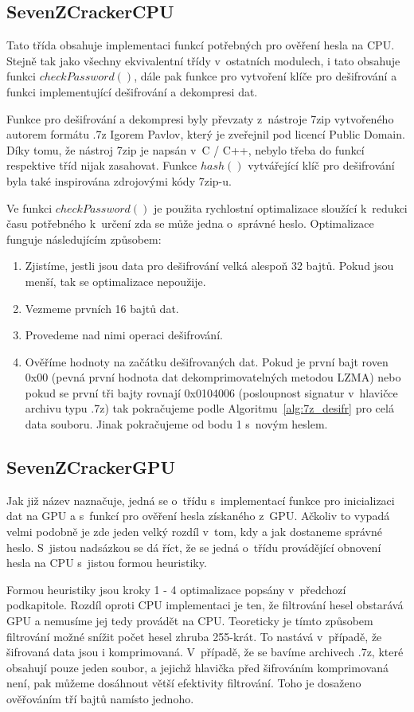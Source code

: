 \subsection{SevenZCrackerCPU}
\label{ssec:7zcrackercpu}
Tato třída obsahuje implementaci funkcí potřebných pro ověření hesla na CPU. Stejně tak jako
všechny ekvivalentní třídy v~ostatních modulech, i tato obsahuje funkci $checkPassword()$, dále pak
funkce pro vytvoření klíče pro dešifrování a funkci implementující dešifrování a dekompresi dat.

 Funkce pro dešifrování a dekompresi byly převzaty z~nástroje 7zip vytvořeného autorem formátu .7z
Igorem Pavlov, který je zveřejnil pod licencí Public Domain. Díky tomu, že nástroj 7zip je
napsán v~C / C++, nebylo třeba do funkcí respektive tříd nijak zasahovat. Funkce $hash()$
vytvářející klíč pro dešifrování byla také inspirována zdrojovými kódy 7zip-u. 

 Ve funkci $checkPassword()$ je použita rychlostní optimalizace sloužící k~redukci času
potřebného k~určení zda se může jedna o~správné heslo. Optimalizace funguje následujícím způsobem:
\begin{enumerate}
    \item Zjistíme, jestli jsou data pro dešifrování velká alespoň 32 bajtů. Pokud jsou menší, tak
	se optimalizace nepoužije.
    \item Vezmeme prvních 16 bajtů dat.
    \item Provedeme nad nimi operaci dešifrování.
    \item Ověříme hodnoty na začátku dešifrovaných dat. Pokud je první bajt roven 0x00
	(pevná první hodnota dat dekomprimovatelných metodou LZMA) nebo pokud se první tři bajty rovnají
	0x0104006 (posloupnost signatur v~hlavičce archivu typu .7z) tak pokračujeme podle
	Algoritmu~\ref{alg:7z_desifr} pro celá data souboru. Jinak pokračujeme od bodu 1 s~novým heslem.
\end{enumerate}
\subsection{SevenZCrackerGPU}
Jak již název naznačuje, jedná se o~třídu s~implementací funkce pro inicializaci dat na GPU a
s~funkcí pro ověření hesla získaného z~GPU. Ačkoliv to vypadá velmi podobně je zde jeden velký
rozdíl v~tom, kdy a jak dostaneme správné heslo. S~jistou nadsázkou se dá říct, že se jedná
o~třídu provádějící obnovení hesla na CPU s~jistou formou heuristiky. 

Formou heuristiky jsou kroky 1 - 4 optimalizace popsány v~předchozí podkapitole. Rozdíl oproti
CPU implementaci je ten, že filtrování hesel obstarává GPU a nemusíme jej tedy provádět na CPU.
Teoreticky je tímto způsobem filtrování možné snížit počet hesel zhruba 255-krát. To nastává
v~případě, že šifrovaná data jsou i komprimovaná. V~případě, že se bavíme archivech .7z, které
obsahují pouze jeden soubor, a jejichž hlavička před šifrováním komprimovaná není, pak můžeme
dosáhnout větší efektivity filtrování. Toho je dosaženo ověřováním tří bajtů namísto jednoho.

